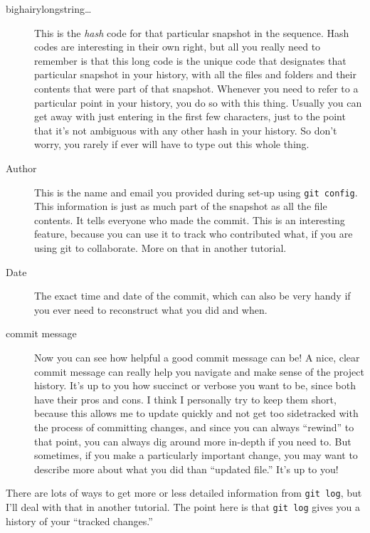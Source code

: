 \documentclass{article}
\begin{document}
\begin{description}
\item[bighairylongstring\ldots{}] This is the \emph{hash} code for that particular snapshot in the sequence. Hash codes are interesting in their own right, but all you really need to remember is that this long code is the unique code that designates that particular snapshot in your history, with all the files and folders and their contents that were part of that snapshot.  Whenever you need to refer to a particular point in your history, you do so with this thing.  Usually you can get away with just entering in the first few characters, just to the point that it's not ambiguous with any other hash in your history.  So don't worry, you rarely if ever will have to type out this whole thing.
\item[Author] This is the name and email you provided during set-up using \texttt{git config}. This information is just as much part of the snapshot as all the file contents. It tells everyone who made the commit. This is an interesting feature, because you can use it to track who contributed what, if you are using git to collaborate.  More on that in another tutorial.
\item[Date] The exact time and date of the commit, which can also be very handy if you ever need to reconstruct what you did and when.
\item[commit message] Now you can see how helpful a good commit message can be!  A nice, clear commit message can really help you navigate and make sense of the project history. It's up to you how succinct or verbose you want to be, since both have their pros and cons.  I think I personally try to keep them short, because this allows me to update quickly and not get too sidetracked with the process of committing changes, and since you can always ``rewind'' to that point, you can always dig around more in-depth if you need to.  But sometimes, if you make a particularly important change, you may want to describe more about what you did than ``updated file.''  It's up to you!
\end{description}

There are lots of ways to get more or less detailed information from \texttt{git log}, but I'll deal with that in another tutorial. The point here is that \texttt{git log} gives you a history of your ``tracked changes.''
\end{document}
